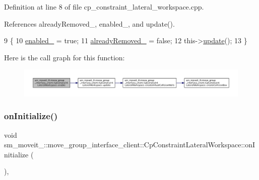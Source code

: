 Definition at line 8 of file cp\+\_\+constraint\+\_\+lateral\+\_\+workspace.\+cpp.



References already\+Removed\+\_\+, enabled\+\_\+, and update().


\begin{DoxyCode}
9         \{
10             \hyperlink{classsm__moveit__4_1_1move__group__interface__client_1_1CpConstraintLateralWorkspace_a7981810bd40955300bb7ba724361d4d7}{enabled\_} = \textcolor{keyword}{true};
11             \hyperlink{classsm__moveit__4_1_1move__group__interface__client_1_1CpConstraintLateralWorkspace_af7cdd50e89bd65438ea95c509ba883a4}{alreadyRemoved\_} = \textcolor{keyword}{false};
12             this->\hyperlink{classsm__moveit__4_1_1move__group__interface__client_1_1CpConstraintLateralWorkspace_a2f4341da0a276e9d9f792f61ef18528c}{update}();
13         \}
\end{DoxyCode}
Here is the call graph for this function\+:
\nopagebreak
\begin{figure}[H]
\begin{center}
\leavevmode
\includegraphics[width=350pt]{classsm__moveit__4_1_1move__group__interface__client_1_1CpConstraintLateralWorkspace_a312f640353ff4402561faee61f7b5d18_cgraph}
\end{center}
\end{figure}
\mbox{\label{classsm__moveit__4_1_1move__group__interface__client_1_1CpConstraintLateralWorkspace_a487463ced53c88f0c0d55d8fcb343da1}} 
\subsubsection{\texorpdfstring{on\+Initialize()}{onInitialize()}}
{\footnotesize\ttfamily void sm\+\_\+moveit\+\_\+::move\+\_\+group\+\_\+interface\+\_\+client\+::\+Cp\+Constraint\+Lateral\+Workspace\+::on\+Initialize (\begin{DoxyParamCaption}{ }\end{DoxyParamCaption})\hspace{0.3cm}{\ttfamily [override]}, {\ttfamily [virtual]}}



